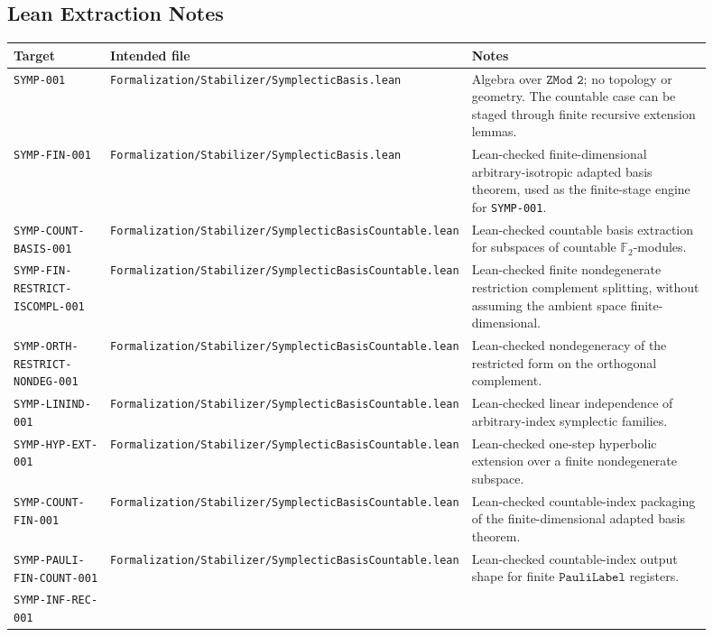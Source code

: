 \documentclass{article}
\newcommand{\Ftwo}{\mathbb F_2}
\begin{document}
\subsection*{Lean Extraction Notes}

\begin{longtable}{@{}p{0.15\linewidth}p{0.34\linewidth}p{0.41\linewidth}@{}}
\toprule
Target & Intended file & Notes \\
\midrule
\endhead
\texttt{SYMP-001} &
\texttt{Formalization/Stabilizer/SymplecticBasis.lean} &
Algebra over \(\texttt{ZMod 2}\); no topology or geometry.  The countable
case can be staged through finite recursive extension lemmas. \\
\texttt{SYMP-FIN-001} &
\texttt{Formalization/Stabilizer/SymplecticBasis.lean} &
Lean-checked finite-dimensional arbitrary-isotropic adapted basis theorem,
used as the finite-stage engine for \texttt{SYMP-001}. \\
\texttt{SYMP-COUNT-BASIS-001} &
\texttt{Formalization/Stabilizer/SymplecticBasisCountable.lean} &
Lean-checked countable basis extraction for subspaces of countable
\(\Ftwo\)-modules. \\
\texttt{SYMP-FIN-RESTRICT-ISCOMPL-001} &
\texttt{Formalization/Stabilizer/SymplecticBasisCountable.lean} &
Lean-checked finite nondegenerate restriction complement splitting, without
assuming the ambient space finite-dimensional. \\
\texttt{SYMP-ORTH-RESTRICT-NONDEG-001} &
\texttt{Formalization/Stabilizer/SymplecticBasisCountable.lean} &
Lean-checked nondegeneracy of the restricted form on the orthogonal
complement. \\
\texttt{SYMP-LININD-001} &
\texttt{Formalization/Stabilizer/SymplecticBasisCountable.lean} &
Lean-checked linear independence of arbitrary-index symplectic families. \\
\texttt{SYMP-HYP-EXT-001} &
\texttt{Formalization/Stabilizer/SymplecticBasisCountable.lean} &
Lean-checked one-step hyperbolic extension over a finite nondegenerate
subspace. \\
\texttt{SYMP-COUNT-FIN-001} &
\texttt{Formalization/Stabilizer/SymplecticBasisCountable.lean} &
Lean-checked countable-index packaging of the finite-dimensional adapted
basis theorem. \\
\texttt{SYMP-PAULI-FIN-COUNT-001} &
\texttt{Formalization/Stabilizer/SymplecticBasisCountable.lean} &
Lean-checked countable-index output shape for finite
\(\texttt{PauliLabel}\) registers. \\
\texttt{SYMP-INF-REC-001} &

\end{longtable}
\end{document}
